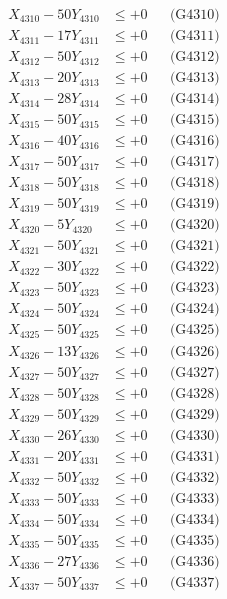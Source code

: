 \documentclass[a4paper,10pt]{article}
\begin{document}
{\begin{align}
X_{4310} - 50Y_{4310} &\leq +0 && \text{(G4310)} \\
\allowbreak
X_{4311} - 17Y_{4311} &\leq +0 && \text{(G4311)} \\
X_{4312} - 50Y_{4312} &\leq +0 && \text{(G4312)} \\
X_{4313} - 20Y_{4313} &\leq +0 && \text{(G4313)} \\
X_{4314} - 28Y_{4314} &\leq +0 && \text{(G4314)} \\
X_{4315} - 50Y_{4315} &\leq +0 && \text{(G4315)} \\
X_{4316} - 40Y_{4316} &\leq +0 && \text{(G4316)} \\
X_{4317} - 50Y_{4317} &\leq +0 && \text{(G4317)} \\
X_{4318} - 50Y_{4318} &\leq +0 && \text{(G4318)} \\
X_{4319} - 50Y_{4319} &\leq +0 && \text{(G4319)} \\
X_{4320} - 5Y_{4320} &\leq +0 && \text{(G4320)} \\
\allowbreak
X_{4321} - 50Y_{4321} &\leq +0 && \text{(G4321)} \\
X_{4322} - 30Y_{4322} &\leq +0 && \text{(G4322)} \\
X_{4323} - 50Y_{4323} &\leq +0 && \text{(G4323)} \\
X_{4324} - 50Y_{4324} &\leq +0 && \text{(G4324)} \\
X_{4325} - 50Y_{4325} &\leq +0 && \text{(G4325)} \\
X_{4326} - 13Y_{4326} &\leq +0 && \text{(G4326)} \\
X_{4327} - 50Y_{4327} &\leq +0 && \text{(G4327)} \\
X_{4328} - 50Y_{4328} &\leq +0 && \text{(G4328)} \\
X_{4329} - 50Y_{4329} &\leq +0 && \text{(G4329)} \\
X_{4330} - 26Y_{4330} &\leq +0 && \text{(G4330)} \\
\allowbreak
X_{4331} - 20Y_{4331} &\leq +0 && \text{(G4331)} \\
X_{4332} - 50Y_{4332} &\leq +0 && \text{(G4332)} \\
X_{4333} - 50Y_{4333} &\leq +0 && \text{(G4333)} \\
X_{4334} - 50Y_{4334} &\leq +0 && \text{(G4334)} \\
X_{4335} - 50Y_{4335} &\leq +0 && \text{(G4335)} \\
X_{4336} - 27Y_{4336} &\leq +0 && \text{(G4336)} \\
X_{4337} - 50Y_{4337} &\leq +0 && \text{(G4337)} \\

\end{align}}
\end{document}
